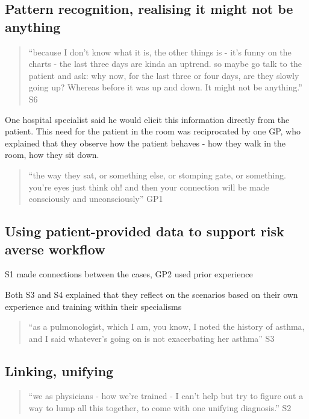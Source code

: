 \documentclass{sigchi}
\begin{document}
\subsection{Pattern recognition, realising it might not be anything}

\begin{quote}
    ``because I don’t know what it is, the other things is - it’s funny on the charts - the last three days are kinda an uptrend. so maybe go talk to the patient and ask: why now, for the last three or four days, are they slowly going up? Whereas before it was up and down. It might not be anything.'' S6
\end{quote}

One hospital specialist said he would elicit this information directly from the patient. This need for the patient in the room was reciprocated by one GP, who explained that they observe how the patient behaves - how they walk in the room, how they sit down. 

\begin{quote}
    ``the way they sat, or something else, or stomping gate, or something. you're eyes just think oh! and then your connection will be made consciously and unconsciously'' GP1
\end{quote}


\subsection{Using patient-provided data to support risk averse workflow}

S1 made connections between the cases, GP2 used prior experience

Both S3 and S4 explained that they reflect on the scenarios based on their own experience and training within their specialisms

\begin{quote}
    ``as a pulmonologist, which I am, you know, I noted the history of asthma, and I said whatever's going on is not exacerbating her asthma'' S3
\end{quote}


\subsection{Linking, unifying}

\begin{quote}
    ``we as physicians - how we're trained - I can't help but try to figure out a way to lump all this together, to come with one unifying diagnosis.'' S2
\end{quote}
\end{document}
